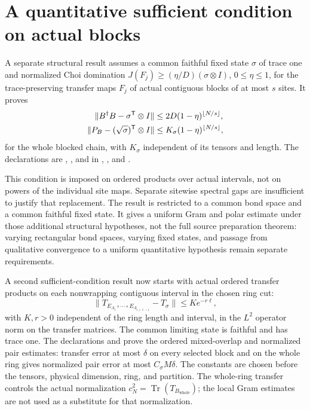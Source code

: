 \documentclass{article}
\begin{document}
\section{A quantitative sufficient condition on actual blocks}
A separate structural result assumes a common faithful fixed state $\sigma$
of trace one and normalized Choi domination
$J(F_j)\ge(\eta/D)(\sigma\otimes I)$, $0\le\eta\le1$, for the
trace-preserving transfer maps $F_j$ of actual contiguous blocks of at most $s$ sites. It proves
\begin{align}
    \lVert B^\dagger B-\sigma^\mathsf{T}\otimes I\rVert
     & \le2D(1-\eta)^{\lfloor N/s\rfloor},\notag  \\
    \lVert P_B-(\sqrt\sigma)^\mathsf{T}\otimes I\rVert
     & \le K_\sigma(1-\eta)^{\lfloor N/s\rfloor},
\end{align}
for the whole blocked chain, with $K_\sigma$ independent of its tensors and
length. The declarations are
,
,
and
in ,
, and
.

This condition is imposed on ordered products over actual intervals, not on
powers of the individual site maps. Separate sitewise spectral gaps are
insufficient to justify that replacement. The result is restricted to a
common bond space and a common faithful fixed state. It gives a uniform
Gram and polar estimate under those additional structural hypotheses, not
the full source preparation theorem: varying rectangular bond spaces,
varying fixed states, and passage from qualitative convergence to a uniform
quantitative hypothesis remain separate requirements.

A second sufficient-condition result now starts with actual ordered transfer
products on each nonwrapping contiguous interval in the chosen ring cut:
\[
    \lVert T_{E_{A_i}\circ\cdots\circ E_{A_{i+\ell-1}}}
    -T_\sigma\rVert \le K e^{-r\ell},
\]
with $K,r>0$ independent of the ring length and interval, in the $L^2$
operator norm on the transfer matrices. The common limiting state is
faithful and has trace one. The declarations
 and
prove the ordered mixed-overlap and normalized pair estimates: transfer
error at most $\delta$ on every selected block and on the whole ring
gives normalized pair error at most $C_\sigma M\delta$. The constants
are chosen before the tensors, physical dimension, ring, and partition.
The whole-ring transfer controls the actual normalization
$c_N^2=\operatorname{Tr}(T_{B_{\mathrm{whole}}})$; the local Gram
estimates are not used as a substitute for that normalization.
\end{document}
